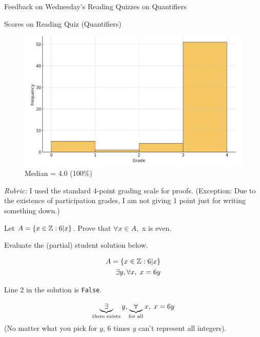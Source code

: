 \documentclass[10pt]{beamer}
\begin{document}
\begin{frame}[standout]
Feedback on Wednesday's Reading Quizzes on Quantifiers
\end{frame} 


\begin{frame}{Scores on Reading Quiz (Quantifiers)}
\begin{figure}
\includegraphics[width=.9\textwidth]{images/reading_quiz_scores}
\caption{Median = 4.0 (100\%)}
\end{figure}	
\vfill 
\footnotesize 
\textit{Rubric:} I used the standard 4-point grading scale for proofs.  (Exception: Due to the existence of participation grades, I am not giving 1 point just for writing something down.)
\end{frame}


\begin{frame}

 \begin{mygreenbox}[title=Reading Quiz (Quantifiers)]
Let $A = \{ {x \in \mathbb{Z}: 6|x} \}$.  Prove that $\forall x \in A, $ x is even.
\end{mygreenbox}
\vfill 
 \begin{myyellowbox}[title=Puzzle]
Evaluate the (partial) student solution below. 
\end{myyellowbox}

\vfill 
 \begin{myredbox}[title=(Partial) Student Solution]

\begin{align}
A = \{ {x \in \mathbb{Z}: 6|x} \} \\
\exists y, \forall x, \; x=6y
\end{align}
\end{myredbox}
\pause 
\vfill 
 \begin{myyellowbox}[title=Comments]
Line 2 in the solution is \texttt{False}. 

\[ \underbrace{\exists}_{\text{there exists}} y, \underbrace{\forall}_{\text{for all}} x, \; x=6y \] 
 (No matter what you pick for $y$, 6 times $y$ can't represent all integers).
\end{myyellowbox}

\end{frame}
\end{document}
